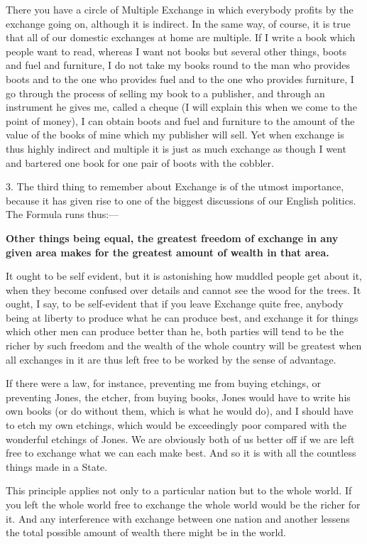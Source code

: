 \documentclass{book}
\begin{document}
There you have a circle of Multiple Exchange in which everybody profits by the exchange going on, although it is indirect. In the same way, of course, it is true that all of our domestic exchanges at home are multiple. If I write a book which people want to read, whereas I want not books but several other things, boots and fuel and furniture, I do not take my books round to the man who provides boots and to the one who provides fuel and to the one who provides furniture, I go through the process of selling my book to a publisher, and through an instrument he gives me, called a cheque (I will explain this when we come to the point of money), I can obtain boots and fuel and furniture to the amount of the value of the books of mine which my publisher will sell. Yet when exchange is thus highly indirect and multiple it is just as much exchange as though I went and bartered one book for one pair of boots with the cobbler.

3. The third thing to remember about Exchange is of the utmost importance, because it has given rise to one of the biggest discussions of our English politics. The Formula runs thus:—

\textbf{Other things being equal, the greatest freedom of exchange in any given area makes for the greatest amount of wealth in that area.}

It ought to be self evident, but it is astonishing how muddled people get about it, when they become confused over details and cannot see the wood for the trees. It ought, I say, to be self-evident that if you leave Exchange quite free, anybody being at liberty to produce what he can produce best, and exchange it for things which other men can produce better than he, both parties will tend to be the richer by such freedom and the wealth of the whole country will be greatest when all exchanges in it are thus left free to be worked by the sense of advantage.

If there were a law, for instance, preventing me from buying etchings, or preventing Jones, the etcher, from buying books, Jones would have to write his own books (or do without them, which is what he would do), and I should have to etch my own etchings, which would be exceedingly poor compared with the wonderful etchings of Jones. We are obviously both of us better off if we are left free to exchange what we can each make best. And so it is with all the countless things made in a State.

This principle applies not only to a particular nation but to the whole world. If you left the whole world free to exchange the whole world would be the richer for it. And any interference with exchange between one nation and another lessens the total possible amount of wealth there might be in the world.
\end{document}
